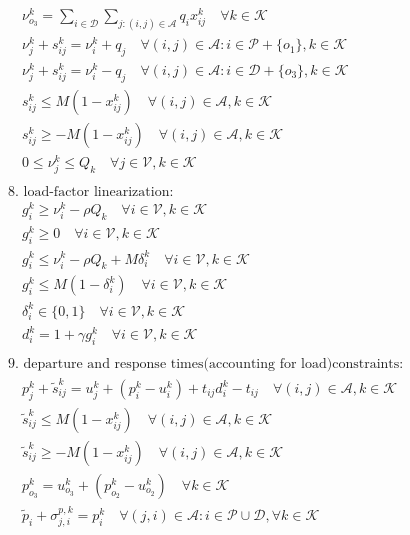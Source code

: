 \documentclass[10pt]{article}
\begin{document}
\begin{align*}
& \quad \nu_{o_3}^k = \sum_{i \in \mathcal{D}} \sum_{j: (i,j) \in \mathcal{A}} q_i x_{ij}^k \quad \forall k \in \mathcal{K} \\
& \quad \nu_j^k + s_{ij}^k = \nu_i^k + q_j \quad \forall (i, j) \in \mathcal{A}: i \in \mathcal{P} + \{o_1\}, k \in \mathcal{K} \\
& \quad \nu_j^k + s_{ij}^k = \nu_i^k - q_j \quad \forall (i, j) \in \mathcal{A}: i \in \mathcal{D} + \{o_3\}, k \in \mathcal{K} \\
& \quad s_{ij}^k \le M(1 - x_{ij}^k) \quad \forall (i, j) \in \mathcal{A}, k \in \mathcal{K} \\
& \quad s_{ij}^k \ge -M(1 - x_{ij}^k) \quad \forall (i, j) \in \mathcal{A}, k \in \mathcal{K} \\
& \quad 0 \le \nu_j^k \le Q_k \quad \forall j \in \mathcal{V}, k \in \mathcal{K} \\
\\
& \text{8. load-factor linearization:} \\
& \quad g_i^k \ge \nu_i^k - \rho Q_k \quad \forall i \in \mathcal{V}, k \in \mathcal{K} \\
& \quad g_i^k \ge 0 \quad \forall i \in \mathcal{V}, k \in \mathcal{K} \\
& \quad g_i^k \le \nu_i^k - \rho Q_k + M \delta_i^k \quad \forall i \in \mathcal{V}, k \in \mathcal{K} \\
& \quad g_i^k \le M(1 - \delta_i^k) \quad \forall i \in \mathcal{V}, k \in \mathcal{K} \\
& \quad \delta_i^k \in \{0, 1\} \quad \forall i \in \mathcal{V}, k \in \mathcal{K} \\
& \quad d_i^k = 1 + \gamma g_i^k \quad \forall i \in \mathcal{V}, k \in \mathcal{K} \\
\\
& \text{9. departure and response times(accounting for load)constraints:} \\
& \quad p_j^k + \tilde{s}_{ij}^k = u_j^k + (p_i^k - u_i^k) + t_{ij} d_i^k - t_{ij} \quad \forall (i, j) \in \mathcal{A}, k \in \mathcal{K} \\
& \quad \tilde{s}_{ij}^k \le M(1 - x_{ij}^k) \quad \forall (i, j) \in \mathcal{A}, k \in \mathcal{K} \\
& \quad \tilde{s}_{ij}^k \ge -M(1 - x_{ij}^k) \quad \forall (i, j) \in \mathcal{A}, k \in \mathcal{K} \\
& \quad p_{o_3}^k = u_{o_3}^k + (p_{o_2}^k - u_{o_2}^k) \quad \forall k \in \mathcal{K} \\
& \quad \tilde{p}_i + \sigma_{j, i}^{p,k} = p_i^k \quad \forall (j, i) \in \mathcal{A}: i \in \mathcal{P} \cup \mathcal{D}, \forall k \in \mathcal{K} \\

\end{align*}
\end{document}
